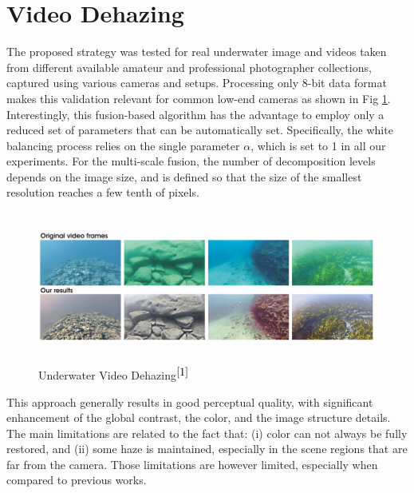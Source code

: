 \documentclass[hidelinks, 12pt]{report}
\begin{document}
\section{Video Dehazing}
The proposed strategy was tested for real underwater image and videos taken from different available amateur and professional photographer collections, captured using various cameras and setups. Processing only 8-bit data format makes this validation relevant for common
low-end cameras as shown in Fig \ref{Video}. Interestingly, this fusion-based algorithm has the advantage to employ only a reduced set of parameters that can be automatically set. Specifically, the white balancing process relies on the single parameter $\alpha$, which is set to 1 in all our experiments. For the multi-scale fusion, the number of decomposition levels depends on the image size, and is defined so that the size of the smallest resolution reaches a few tenth of pixels.
\begin{figure}[H]
\centering
\includegraphics[width=15cm,height=5cm]{Video.png}
\caption[Underwater Video Dehazing]{Underwater Video Dehazing$^{\cite{1}}$}
\label{Video}
\end{figure}
This approach generally results in good perceptual quality, with significant enhancement of the global contrast, the color, and the image structure details. The main limitations are related to the fact that: (i) color can not always be fully restored, and (ii) some haze is maintained, especially in the scene regions that are far from the camera. Those limitations are however limited, especially when compared to previous works.
\end{document}
